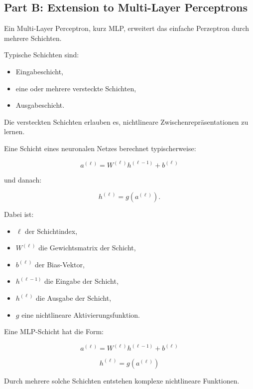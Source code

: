 \documentclass[11pt,a4paper]{scrartcl}
\begin{document}
\subsection{Part B: Extension to Multi-Layer Perceptrons}

\begin{notebox}
    Ein Multi-Layer Perceptron, kurz MLP, erweitert das einfache Perzeptron durch
    mehrere Schichten.

    Typische Schichten sind:

    \begin{itemize}
        \item Eingabeschicht,
        \item eine oder mehrere versteckte Schichten,
        \item Ausgabeschicht.
    \end{itemize}

    Die versteckten Schichten erlauben es, nichtlineare Zwischenrepräsentationen
    zu lernen.
\end{notebox}

\begin{solutionbox}
    Eine Schicht eines neuronalen Netzes berechnet typischerweise:

    \[
        a^{(\ell)}
        =
        W^{(\ell)} h^{(\ell-1)} + b^{(\ell)}
    \]

    und danach:

    \[
        h^{(\ell)}
        =
        g(a^{(\ell)}).
    \]

    Dabei ist:

    \begin{itemize}
        \item \(\ell\) der Schichtindex,
        \item \(W^{(\ell)}\) die Gewichtsmatrix der Schicht,
        \item \(b^{(\ell)}\) der Bias-Vektor,
        \item \(h^{(\ell-1)}\) die Eingabe der Schicht,
        \item \(h^{(\ell)}\) die Ausgabe der Schicht,
        \item \(g\) eine nichtlineare Aktivierungsfunktion.
    \end{itemize}
\end{solutionbox}

\begin{answerbox}
    Eine MLP-Schicht hat die Form:

    \[
        \boxed{
            a^{(\ell)}
            =
            W^{(\ell)}h^{(\ell-1)} + b^{(\ell)}
        }
    \]

    \[
        \boxed{
            h^{(\ell)}
            =
            g(a^{(\ell)})
        }
    \]

    Durch mehrere solche Schichten entstehen komplexe nichtlineare Funktionen.
\end{answerbox}
\end{document}
